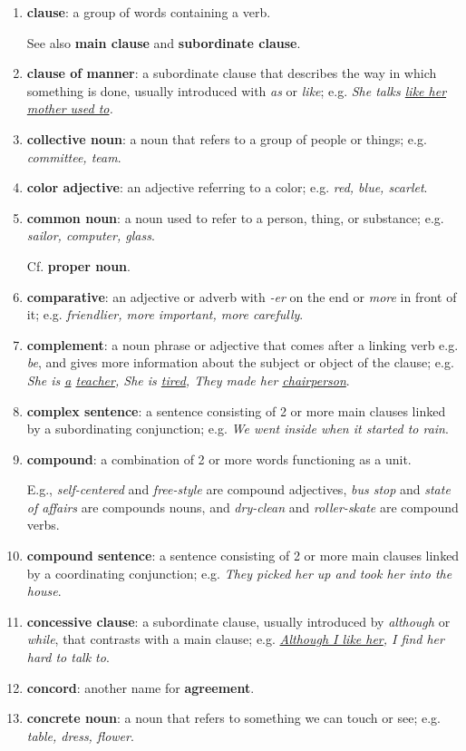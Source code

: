 \documentclass[oneside]{book}
\numberwithin{equation}{section}
\begin{document}
\begin{enumerate}
    They do not have comparatives or superlatives.
    
    Cf. \textbf{qualitative adjective}.
    \item \textbf{clause}: a group of words containing a verb.
    
    See also \textbf{main clause} and \textbf{subordinate clause}.
    \item \textbf{clause of manner}: a subordinate clause that describes the way in which something is done, usually introduced with \textit{as} or \textit{like}; e.g. \textit{She talks \underline{like her mother used to}.}
    \item \textbf{collective noun}: a noun that refers to a group of people or things; e.g. \textit{committee, team}.
    \item \textbf{color adjective}: an adjective referring to a color; e.g. \textit{red, blue, scarlet}.
    \item \textbf{common noun}: a noun used to refer to a person, thing, or substance; e.g. \textit{sailor, computer, glass}.
    
    Cf. \textbf{proper noun}.
    \item \textbf{comparative}: an adjective or adverb with \textit{-er} on the end or \textit{more} in front of it; e.g. \textit{friendlier, more important, more carefully}.
    \item \textbf{complement}: a noun phrase or adjective that comes after a linking verb e.g. \textit{be}, and gives more information about the subject or object of the clause; e.g. \textit{She is \underline{a} \underline{teacher}, She is \underline{tired}, They made her \underline{chairperson}}.
    \item \textbf{complex sentence}: a sentence consisting of 2 or more main clauses linked by a subordinating conjunction; e.g. \textit{We went inside when it started to rain}.
    \item \textbf{compound}: a combination of 2 or more words functioning as a unit.
    
    E.g., \textit{self-centered} and \textit{free-style} are compound adjectives, \textit{bus stop} and \textit{state of affairs} are compounds nouns, and \textit{dry-clean} and \textit{roller-skate} are compound verbs.
    \item \textbf{compound sentence}: a sentence consisting of 2 or more main clauses linked by a coordinating conjunction; e.g. \textit{They picked her up and took her into the house}.
    \item \textbf{concessive clause}: a subordinate clause, usually introduced by \textit{although} or \textit{while}, that contrasts with a main clause; e.g. \textit{\underline{Although I like her}, I find her hard to talk to}.
    \item \textbf{concord}: another name for \textbf{agreement}.
    \item \textbf{concrete noun}: a noun that refers to something we can touch or see; e.g. \textit{table, dress, flower}.
    

\end{enumerate}
\end{document}
